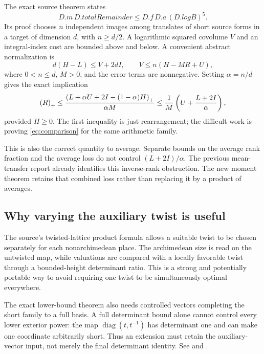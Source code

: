 The exact source theorem
states
\begin{equation}\label{eq:source-star}
 D.m\,D.totalRemainder\le D.f\,D.a\,(D.logB)^5.
\end{equation}
Its proof chooses $n$ independent images among translates of short source forms in a target of dimension $d$, with $n\ge d/2$. A logarithmic squared covolume $V$ and an integral-index cost are bounded above and below. A convenient abstract normalization is
\begin{equation}\label{eq:comparison}
 d(H-L)\le V+2dI,\qquad
 V\le n(H-MR+U),
\end{equation}
where $0<n\le d$, $M>0$, and the error terms are nonnegative. Setting $\alpha=n/d$ gives the exact implication
\begin{equation}\label{eq:rank-loss}
 \left(R\right)_{+}\le
 \frac{\left(L+\alpha U+2I-(1-\alpha)H\right)_{+}}{\alpha M}
 \le\frac1M\left(U+\frac{L+2I}{\alpha}\right),
\end{equation}
provided $H\ge0$. The first inequality is just rearrangement; the difficult work is proving \eqref{eq:comparison} for the same arithmetic family.

This is also the correct quantity to average. Separate bounds on the average rank fraction and the average loss do not control $(L+2I)/\alpha$. The previous mean-transfer report already identifies this inverse-rank obstruction. The new moment theorem retains that combined loss rather than replacing it by a product of averages.\cite{priorMean}

\subsection{Why varying the auxiliary twist is useful}

The source's twisted-lattice product formula allows a suitable twist to be chosen separately for each nonarchimedean place. The archimedean size is read on the untwisted map, while valuations are compared with a locally favorable twist through a bounded-height determinant ratio. This is a strong and potentially portable way to avoid requiring one twist to be simultaneously optimal everywhere.

The exact lower-bound theorem also needs controlled vectors completing the short family to a full basis. A full determinant bound alone cannot control every lower exterior power: the map $\operatorname{diag}(t,t^{-1})$ has determinant one and can make one coordinate arbitrarily short. Thus an extension must retain the auxiliary-vector input, not merely the final determinant identity. See
and .

